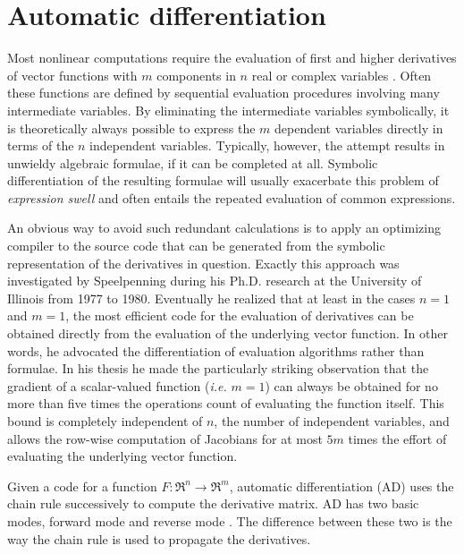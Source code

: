 \section{Automatic differentiation} \label{sec:adolc}

Most nonlinear computations require the evaluation of first and higher
derivatives of vector functions with $m$ components in $n$ real or
complex variables \cite{adol-c:96}.  Often these functions are defined
by sequential evaluation procedures involving many intermediate
variables. By eliminating the intermediate variables symbolically, it
is theoretically always possible to express the $m$ dependent
variables directly in terms of the $n$ independent
variables. Typically, however, the attempt results in unwieldy
algebraic formulae, if it can be completed at all. Symbolic
differentiation of the resulting formulae will usually exacerbate
this problem of \emph{expression swell} and often entails the repeated
evaluation of common expressions.

An obvious way to avoid such redundant calculations is to apply an
optimizing compiler to the source code that can be generated from the
symbolic representation of the derivatives in question. Exactly this
approach was investigated by Speelpenning during his Ph.D. research
\cite{speelpenning} at the University of Illinois from 1977 to
1980. Eventually he realized that at least in the cases $n = 1$ and $m
= 1$, the most efficient code for the evaluation of derivatives can be
obtained directly from the evaluation of the underlying vector
function. In other words, he advocated the differentiation of
evaluation algorithms rather than formulae. In his thesis he made the
particularly striking observation that the gradient of a scalar-valued
function (\emph{i.e.} $m = 1$) can always be obtained for no more than
five times the operations count of evaluating the function
itself. This bound is completely independent of $n$, the number of
independent variables, and allows the row-wise computation of
Jacobians for at most $5 m$ times the effort of evaluating the
underlying vector function.

Given a code for a function $F : \Re^n \rightarrow \Re^m$, automatic
differentiation (AD) uses the chain rule successively to compute the
derivative matrix. AD has two basic modes, forward mode and reverse
mode \cite{coleman}. The difference between these two is the way the
chain rule is used to propagate the derivatives. 


